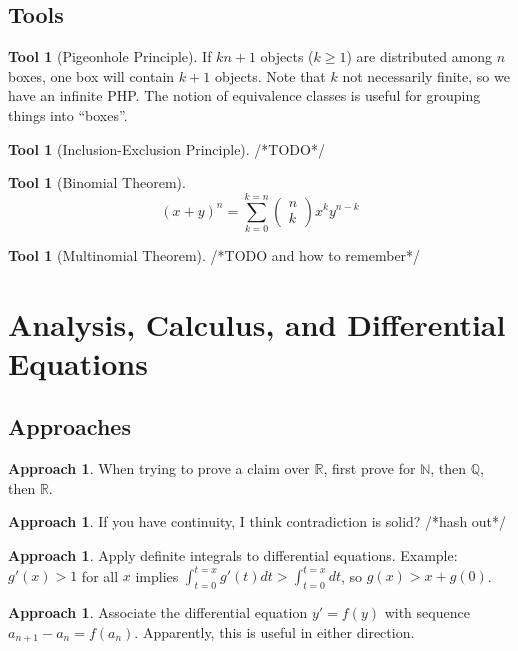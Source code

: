 \documentclass[12pt]{amsart}
\theoremstyle{definition}
\newtheorem{tool}[theorem]{Tool}
\newtheorem{approach}[theorem]{Approach}
\begin{document}
\subsection{Tools}
\begin{tool}[Pigeonhole Principle]
    If $kn+1$ objects ($k \geq 1$) are distributed among $n$ boxes, one box
    will contain $k+1$ objects. Note that $k$ not necessarily finite, so we
    have an infinite PHP. The notion of equivalence classes is useful for
    grouping things into ``boxes''.
\end{tool}
\begin{tool}[Inclusion-Exclusion Principle] /*TODO*/ \end{tool}
\begin{tool}[Binomial Theorem]
    \begin{equation*}
        (x+y)^n = \sum_{k=0}^{k=n}\begin{pmatrix} n \\ k \end{pmatrix} x^k
        y^{n-k}
    \end{equation*}
\end{tool}
\begin{tool}[Multinomial Theorem] /*TODO and how to remember*/\end{tool}

\section{Analysis, Calculus, and Differential Equations}
\subsection{Approaches}
\begin{approach}
    When trying to prove a claim over $\mathbb{R}$, first prove for
    $\mathbb{N}$, then $\mathbb{Q}$, then $\mathbb{R}$.
\end{approach}
\begin{approach}
    If you have continuity, I think contradiction is solid? /*hash out*/
\end{approach}
\begin{approach}
    Apply definite integrals to differential equations. Example: $g'(x) >
    1$ for all $x$ implies $\int_{t=0}^{t=x}g'(t)dt > \int_{t=0}^{t=x}dt$,
    so $g(x) > x + g(0)$.
\end{approach}
\begin{approach}
    Associate the differential equation $y' = f(y)$ with sequence $a_{n+1}
    - a_n = f(a_n)$. Apparently, this is useful in either direction.
\end{approach}
\end{document}
